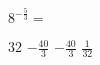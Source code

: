 \( 8^{-\frac{5}{3}} = \)

\answers
{\( 32 \)}
{\( -\frac{40}{3} \)}
{\( -\frac{40}{3} \)}
{\(  \frac{1}{32} \)}